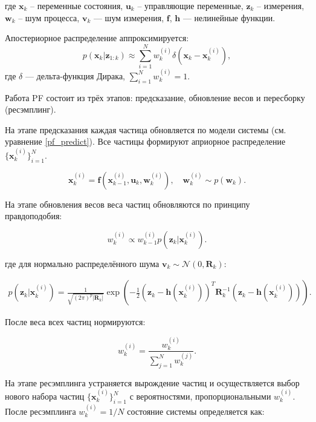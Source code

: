 где \(\mathbf{x}_k\) -- переменные состояния, \(\mathbf{u}_k\) -- управляющие переменные,
\(\mathbf{z}_k\) -- измерения,
\(\mathbf{w}_k\) -- шум процесса,
\(\mathbf{v}_k\) — шум измерения,
\(\mathbf{f}\), \(\mathbf{h}\) — нелинейные функции. 

Апостериорное распределение аппроксимируется:
\begin{equation}
    p(\mathbf{x}_k | \mathbf{z}_{1:k}) \approx \sum_{i=1}^N w_k^{(i)} \delta(\mathbf{x}_k - \mathbf{x}_k^{(i)}),
\end{equation}
где \(\delta\) — дельта-функция Дирака, \(\sum_{i=1}^N w_k^{(i)} = 1\).


Работа PF состоит из трёх этапов: предсказание, обновление весов и пересборку (ресэмплинг).

На этапе предсказания каждая частица обновляется по модели системы (см. уравнение \ref{pf_predict}).
Все частицы формируют априорное распределение \(\{\mathbf{x}_k^{(i)}\}_{i=1}^N\).

\begin{equation}
	\mathbf{x}_k^{(i)} = \mathbf{f}(\mathbf{x}_{k-1}^{(i)}, \mathbf{u}_k, \mathbf{w}_k^{(i)}), \quad \mathbf{w}_k^{(i)} \sim p(\mathbf{w}_k). \label{pf_predict}
\end{equation}


На этапе обновления весов веса частиц обновляются по принципу правдоподобия:

\begin{equation}
	w_k^{(i)} \propto w_{k-1}^{(i)} p(\mathbf{z}_k | \mathbf{x}_k^{(i)}).
\end{equation}

где для нормально распределённого шума \(\mathbf{v}_k \sim \mathcal{N}(0, \mathbf{R}_k)\):

\begin{align}
    p(\mathbf{z}_k | \mathbf{x}_k^{(i)}) = \frac{1}{\sqrt{(2\pi)^p |\mathbf{R}_k|}} \exp\left(-\frac{1}{2} (\mathbf{z}_k - \mathbf{h}(\mathbf{x}_k^{(i)}))^T \mathbf{R}_k^{-1} (\mathbf{z}_k - \mathbf{h}(\mathbf{x}_k^{(i)}))\right).
\end{align}

После веса всех частиц нормируются:

\begin{equation}
    w_k^{(i)} = \frac{w_k^{(i)}}{\sum_{j=1}^N w_k^{(j)}}.
\end{equation}

На этапе ресэмплинга устраняется вырождение частиц
и осуществляется выбор нового набора частиц \(\{\mathbf{x}_k^{(i)}\}_{i=1}^N\) с вероятностями,
пропорциональными \(w_k^{(i)}\). После ресэмплинга \(w_k^{(i)} = 1/N\) состояние системы 
определяется как:


